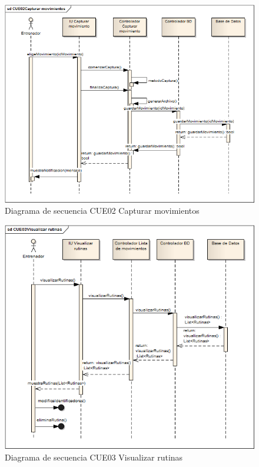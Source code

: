 \begin{figure}[H]
	\begin{center}
		\includegraphics[scale=0.6]{./Figuras/Secuencias/CUE02Capturar_movimientos}
	\end{center}
	\caption{Diagrama de secuencia CUE02 Capturar movimientos}
	\label{fig:SE_CUE02}
\end{figure}

\begin{figure}[H]
	\begin{center}
		\includegraphics[scale=0.6]{./Figuras/Secuencias/CUE03Visualizar_rutinas}
	\end{center}
	\caption{Diagrama de secuencia CUE03 Visualizar rutinas}
	\label{fig:SE_CUE03}
\end{figure}


